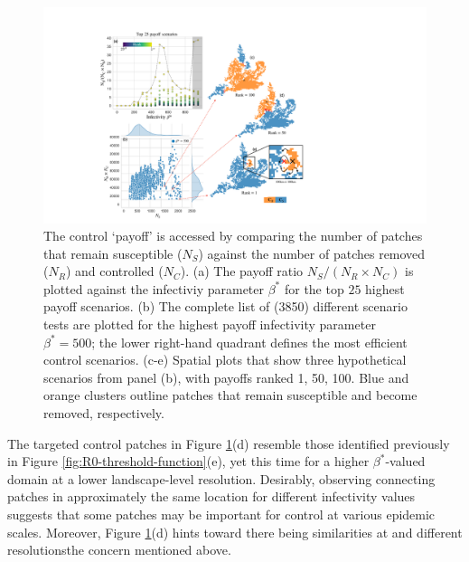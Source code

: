 \begin{figure}
    \centering
    \includegraphics[scale=0.45]{chapter7/figures/figure4-scenario-payoff.pdf}
    \caption{The control `payoff' is accessed by comparing the number of patches that remain susceptible ($N_S$) against the number of patches removed ($N_R$) and controlled ($N_C$).
             (a) The payoff ratio $N_S / (N_R \times N_C)$ is plotted against the infectiviy parameter $\beta^*$ for the top $25$ highest payoff scenarios.
             (b) The complete list of (3850) different scenario tests are plotted for the highest payoff infectivity parameter $\beta^*=500$; the lower right-hand quadrant defines the most efficient control scenarios.
             (c-e) Spatial plots that show three hypothetical scenarios from panel (b), with payoffs ranked 1, 50, 100. 
             Blue and orange clusters outline patches that remain susceptible and become removed, respectively.
             }
    \label{fig:payoff-efficiency}
\end{figure}

The targeted control patches in Figure \ref{fig:payoff-efficiency}(d) resemble those identified previously in Figure \ref{fig:R0-threshold-function}(e), yet this time for a higher $\beta^*$-valued domain at a lower landscape-level resolution.
Desirably, observing connecting patches in approximately the same location for different infectivity values suggests that some patches may be important for control at various epidemic scales.
Moreover, Figure \ref{fig:payoff-efficiency}(d) hints toward there being similarities at and different resolutions\textemdash the concern mentioned above.


